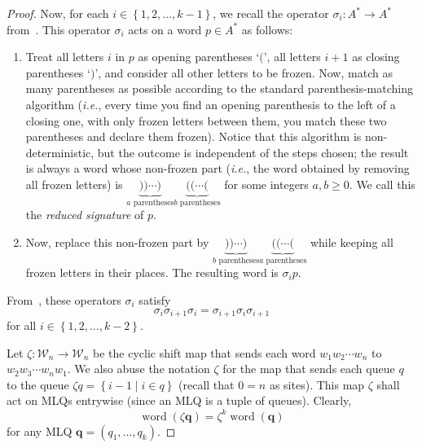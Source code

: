 \documentclass[reqno]{amsart}
\newcommand{\0}{\phantom{c}}
\DeclareMathOperator{\word}{word} %
\newcommand{\qq}{\mathbf{q}}
\newcommand{\mcW}{\mathcal{W}}
\newenvironment{verlong}{}{}
\newcommand{\set}[1]{\left\{ #1 \right\}}
\newcommand{\tup}[1]{\left( #1 \right)}
\newcommand{\defn}[1]{{\color{darkred}\emph{#1}}} %
\theoremstyle{plain}
\theoremstyle{definition}
\numberwithin{equation}{section}
\begin{document}
\begin{verlong}
\begin{proof}
Now, for each $i \in \set{1, 2, \ldots, k-1}$, we recall the operator
$\sigma_i \colon A^* \to A^*$ from~\cite[\S5.5]{Loth}.
This operator $\sigma_i$ acts on a word $p \in A^*$ %
as follows:
\begin{enumerate}
 \item Treat all letters $i$ in $p$ as opening parentheses `$($',
       all letters $i+1$ as closing parentheses `$)$',
       and consider all other letters to be frozen.
       Now, match as many parentheses as possible
       according to the standard parenthesis-matching
       algorithm (\textit{i.e.}, every time you find an opening
       parenthesis to the left of a closing one, with only
       frozen letters between them, you match these two
       parentheses and declare them frozen).
       Notice that this algorithm is non-deterministic, but
       the outcome is independent of the steps chosen;
       the result is always a word whose non-frozen
       part (\textit{i.e.}, the word obtained by removing
       all frozen letters) is
       $\underbrace{))\cdots)}_{a\text{ parentheses}}
       \underbrace{((\cdots(}_{b\text{ parentheses}}$
       for some integers $a, b \geq 0$.
       We call this the \defn{reduced signature} of $p$.
 \item Now, replace this non-frozen part by
       $\underbrace{))\cdots)}_{b\text{ parentheses}}
       \underbrace{((\cdots(}_{a\text{ parentheses}}$
       while keeping all frozen letters in their places.
       The resulting word is $\sigma_i p$.
\end{enumerate}
From~\cite[Eq.~(5.6.3)]{Loth}, these operators
$\sigma_i$ satisfy
\begin{equation}
 \sigma_i \sigma_{i+1} \sigma_i
 = \sigma_{i+1} \sigma_i \sigma_{i+1}
 \label{pf.prop:braid.loth-eq-old6}
\end{equation}
for all $i \in \set{1, 2, \ldots, k-2}$.

Let $\zeta \colon \mcW_n \to \mcW_n$ be the cyclic shift map that sends each word $w_1 w_2 \cdots w_n$ to $w_2 w_3 \cdots w_n w_1$.
We also abuse the notation $\zeta$ for the map that sends each queue $q$ to the queue $\zeta q = \set{ i - 1 \mid i \in q }$ (recall that $0 = n$ as sites).
This map $\zeta$ shall act on MLQs entrywise (since an MLQ is a tuple of queues).
Clearly,
\begin{equation}
 \word(\zeta \qq) = \zeta^k \word(\qq)
 \label{pf.prop:braid.word-zeta-old6}
\end{equation}
for any MLQ $\qq = (q_1, \ldots, q_k)$.


\end{proof}
\end{verlong}
\end{document}
